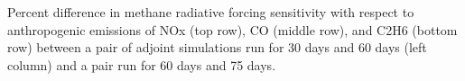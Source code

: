 Percent difference in methane radiative forcing sensitivity with respect to anthropogenic emissions of NOx (top row), CO (middle row), and C2H6 (bottom row) between a pair of adjoint simulations run for 30 days and 60 days (left column) and a pair run for 60 days and 75 days. \label{fig:diffwindow}
